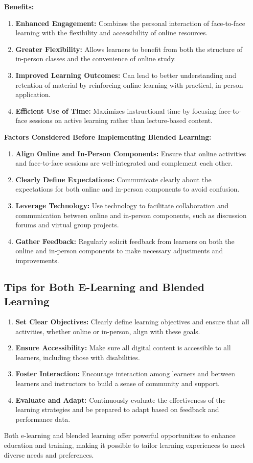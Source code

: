\documentclass[10pt]{article}
\begin{document}
\textbf{Benefits:}
\begin{enumerate}[label=\roman*.]
    \item \textbf{Enhanced Engagement:} Combines the personal interaction of face-to-face learning with the flexibility and accessibility of online resources.
    \item \textbf{Greater Flexibility:} Allows learners to benefit from both the structure of in-person classes and the convenience of online study.
    \item \textbf{Improved Learning Outcomes:} Can lead to better understanding and retention of material by reinforcing online learning with practical, in-person application.
    \item \textbf{Efficient Use of Time:} Maximizes instructional time by focusing face-to-face sessions on active learning rather than lecture-based content.
\end{enumerate}

\textbf{Factors Considered Before Implementing Blended Learning:}
\begin{enumerate}[label=\alph*)]
    \item \textbf{Align Online and In-Person Components:} Ensure that online activities and face-to-face sessions are well-integrated and complement each other.
    \item \textbf{Clearly Define Expectations:} Communicate clearly about the expectations for both online and in-person components to avoid confusion.
    \item \textbf{Leverage Technology:} Use technology to facilitate collaboration and communication between online and in-person components, such as discussion forums and virtual group projects.
    \item \textbf{Gather Feedback:} Regularly solicit feedback from learners on both the online and in-person components to make necessary adjustments and improvements.
\end{enumerate}

\subsection*{Tips for Both E-Learning and Blended Learning}

\begin{enumerate}[label=\roman*.]
    \item \textbf{Set Clear Objectives:} Clearly define learning objectives and ensure that all activities, whether online or in-person, align with these goals.
    \item \textbf{Ensure Accessibility:} Make sure all digital content is accessible to all learners, including those with disabilities.
    \item \textbf{Foster Interaction:} Encourage interaction among learners and between learners and instructors to build a sense of community and support.
    \item \textbf{Evaluate and Adapt:} Continuously evaluate the effectiveness of the learning strategies and be prepared to adapt based on feedback and performance data.
\end{enumerate}

Both e-learning and blended learning offer powerful opportunities to enhance education and training, making it possible to tailor learning experiences to meet diverse needs and preferences.
\end{document}
